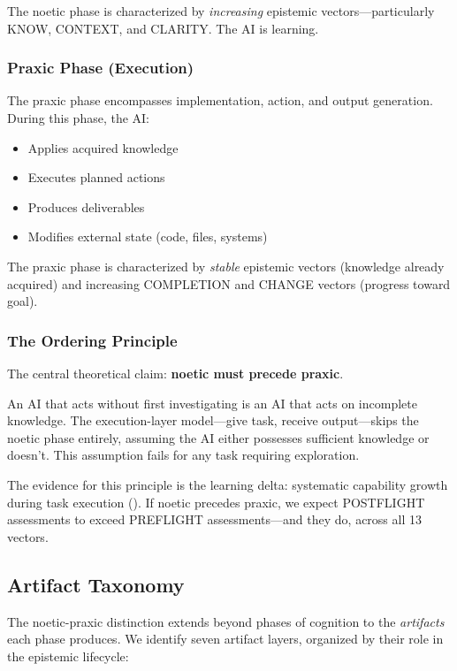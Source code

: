 The noetic phase is characterized by \emph{increasing} epistemic vectors---particularly KNOW, CONTEXT, and CLARITY. The AI is learning.

\subsubsection{Praxic Phase (Execution)}

The praxic phase encompasses implementation, action, and output generation. During this phase, the AI:

\begin{itemize}
    \item Applies acquired knowledge
    \item Executes planned actions
    \item Produces deliverables
    \item Modifies external state (code, files, systems)
\end{itemize}

The praxic phase is characterized by \emph{stable} epistemic vectors (knowledge already acquired) and increasing COMPLETION and CHANGE vectors (progress toward goal).

\subsubsection{The Ordering Principle}

The central theoretical claim: \textbf{noetic must precede praxic}.

An AI that acts without first investigating is an AI that acts on incomplete knowledge. The execution-layer model---give task, receive output---skips the noetic phase entirely, assuming the AI either possesses sufficient knowledge or doesn't. This assumption fails for any task requiring exploration.

The evidence for this principle is the learning delta: systematic capability growth during task execution (). If noetic precedes praxic, we expect POSTFLIGHT assessments to exceed PREFLIGHT assessments---and they do, across all 13 vectors.

\subsection{Artifact Taxonomy}

The noetic-praxic distinction extends beyond phases of cognition to the \emph{artifacts} each phase produces. We identify seven artifact layers, organized by their role in the epistemic lifecycle:

